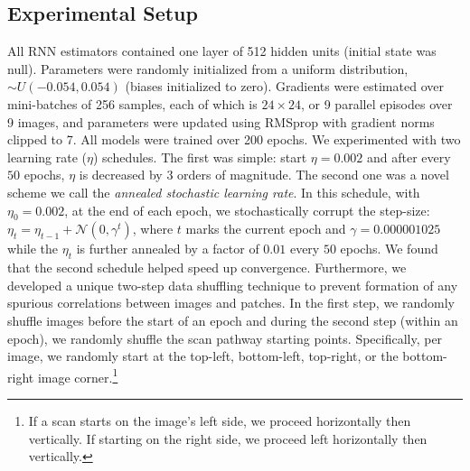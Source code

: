 \documentclass[smallabstract,smallcaptions]{dccpaper}
\begin{document}
\subsection{Experimental Setup}
\label{exp:design}
All RNN estimators contained one layer of 512 hidden units (initial state was null). Parameters were randomly initialized from a uniform distribution, $\sim U(-0.054, 0.054)$ (biases initialized to zero). Gradients were estimated over mini-batches of 256 samples, each of which is $24 \times 24$, or 9 parallel episodes over 9 images, and parameters were updated using RMSprop {\cite{Tieleman2012}} with gradient norms clipped to 7. All models were trained over 200 epochs. We experimented with two learning rate ($\eta$) schedules. The first was simple: start $\eta = 0.002$ and after every $50$ epochs, $\eta$ is decreased by $3$ orders of magnitude. 
The second one was a novel scheme we call the \emph{annealed stochastic learning rate}. In this schedule, with $\eta_0 = 0.002$, at the end of each epoch, we stochastically corrupt the step-size: $\eta_t  = \eta_{t-1} + \mathcal{N}(0,\gamma^{t})$, where $t$ marks the current epoch and $\gamma = 0.000001025$ while the $\eta_t$ is further annealed by a factor of $0.01$ every $50$ epochs. We found that the second schedule helped speed up convergence. Furthermore, we developed a unique two-step data shuffling technique to prevent formation of any spurious correlations between images and patches. In the first step, we randomly shuffle images before the start of an epoch and during the second step (within an epoch), we randomly shuffle the scan pathway starting points. Specifically, per image, we randomly start at the top-left, bottom-left, top-right, or the bottom-right image corner.\footnote{If a scan starts on the image's left side, we proceed horizontally then vertically. If starting on the right side, we proceed left horizontally then vertically.}   %


\end{document}
